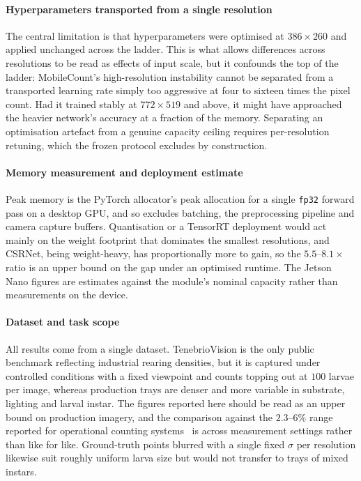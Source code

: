 \documentclass[conference]{IEEEtran}
\begin{document}
\paragraph{Hyperparameters transported from a single resolution}
The central limitation is that hyperparameters were optimised at $386\times260$
and applied unchanged across the ladder. This is what allows differences across
resolutions to be read as effects of input scale, but it confounds the top of
the ladder: MobileCount's high-resolution instability cannot be separated from a
transported learning rate simply too aggressive at four to sixteen times the
pixel count. Had it trained stably at $772\times519$ and above, it might have
approached the heavier network's accuracy at a fraction of the memory.
Separating an optimisation artefact from a genuine capacity ceiling requires
per-resolution retuning, which the frozen protocol excludes by construction.

\paragraph{Memory measurement and deployment estimate}
Peak memory is the PyTorch allocator's peak allocation for a single
\texttt{fp32} forward pass on a desktop GPU, and so excludes batching, the
preprocessing pipeline and camera capture buffers. Quantisation or a TensorRT
deployment would act mainly on the weight footprint that dominates the smallest
resolutions, and CSRNet, being weight-heavy, has proportionally more to gain, so
the $5.5$--$8.1\times$ ratio is an upper bound on the gap under an optimised
runtime. The Jetson Nano figures are estimates against the module's nominal
capacity rather than measurements on the device.

\paragraph{Dataset and task scope}
All results come from a single dataset. TenebrioVision is the only public
benchmark reflecting industrial rearing densities, but it is captured under
controlled conditions with a fixed viewpoint and counts topping out at $100$
larvae per image, whereas production trays are denser and more variable in
substrate, lighting and larval instar. The figures reported here should be read
as an upper bound on production imagery, and the comparison against the
$2.3$--$6\%$ range reported for operational counting
systems~\cite{mamai2019, benedict2020} is across measurement settings rather
than like for like. Ground-truth points blurred with a single fixed $\sigma$ per
resolution likewise suit roughly uniform larva size but would not transfer to
trays of mixed instars.
\end{document}
